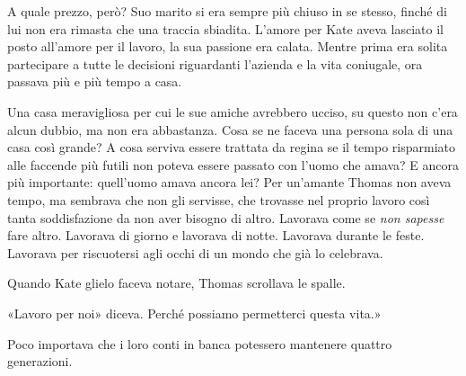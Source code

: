 \documentclass[a4paper,oneside,11pt]{memoir}
\begin{document}
A quale prezzo, però? Suo marito si era sempre più chiuso in se stesso, finché
di lui non era rimasta che una traccia sbiadita. L'amore per Kate aveva lasciato
il posto all'amore per il lavoro, la sua passione era calata. Mentre prima era
solita partecipare a tutte le decisioni riguardanti l'azienda e la vita
coniugale, ora passava più e più tempo a casa.

Una casa meravigliosa per cui le sue amiche avrebbero ucciso, su questo non
c'era alcun dubbio, ma non era abbastanza. Cosa se ne faceva una persona sola di
una casa così grande? A cosa serviva essere trattata da regina se il tempo
risparmiato alle faccende più futili non poteva essere passato con l'uomo che
amava? E ancora più importante: quell'uomo amava ancora lei? Per un'amante
Thomas non aveva tempo, ma sembrava che non gli servisse, che trovasse nel
proprio lavoro così tanta soddisfazione da non aver bisogno di altro. Lavorava
come se \emph{non sapesse} fare altro. Lavorava di giorno e lavorava di notte.
Lavorava durante le feste. Lavorava per riscuotersi agli occhi di un mondo che
già lo celebrava.

Quando Kate glielo faceva notare, Thomas scrollava le spalle.

«Lavoro per noi» diceva. Perché possiamo permetterci questa vita.»

Poco importava che i loro conti in banca potessero mantenere quattro
generazioni.
\end{document}
